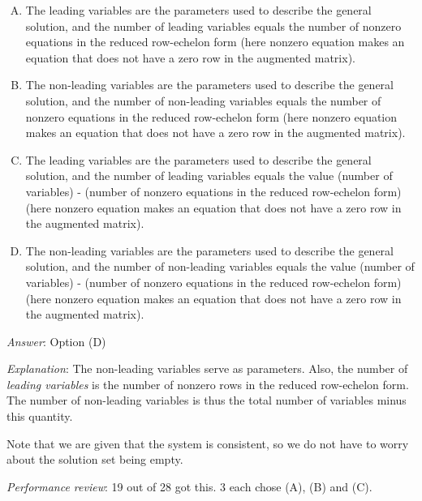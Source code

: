 \documentclass[10pt]{amsart}
\begin{document}
\begin{enumerate}
  \begin{enumerate}[(A)]
  \item The leading variables are the parameters used to describe the
    general solution, and the number of leading variables equals the
    number of nonzero equations in the reduced row-echelon form (here
    nonzero equation makes an equation that does not have a zero row
    in the augmented matrix).
  \item The non-leading variables are the parameters used to describe the
    general solution, and the number of non-leading variables equals the
    number of nonzero equations in the reduced row-echelon form (here
    nonzero equation makes an equation that does not have a zero row
    in the augmented matrix).
  \item The leading variables are the parameters used to describe the
    general solution, and the number of leading variables equals the
    value (number of variables) - (number of nonzero equations in the
    reduced row-echelon form) (here nonzero equation makes an equation
    that does not have a zero row in the augmented matrix).
  \item The non-leading variables are the parameters used to describe
    the general solution, and the number of non-leading variables
    equals the value (number of variables) - (number of nonzero equations
    in the reduced row-echelon form) (here nonzero equation makes an
    equation that does not have a zero row in the augmented matrix).
  \end{enumerate}

  {\em Answer}: Option (D)

  {\em Explanation}: The non-leading variables serve as
  parameters. Also, the number of {\em leading variables} is the
  number of nonzero rows in the reduced row-echelon form. The number
  of non-leading variables is thus the total number of variables minus
  this quantity.

  Note that we are given that the system is consistent, so we do not
  have to worry about the solution set being empty.

  {\em Performance review}: 19 out of 28 got this. 3 each chose (A),
  (B) and (C).
\end{enumerate}
\end{document}
